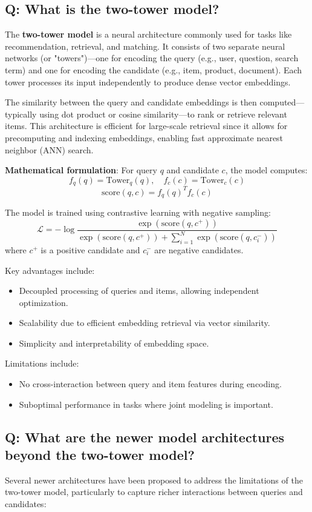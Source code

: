 \subsection*{Q: What is the two-tower model?}
The \textbf{two-tower model} is a neural architecture commonly used for tasks like recommendation, retrieval, and matching. It consists of two separate neural networks (or "towers")—one for encoding the query (e.g., user, question, search term) and one for encoding the candidate (e.g., item, product, document). Each tower processes its input independently to produce dense vector embeddings.

The similarity between the query and candidate embeddings is then computed—typically using dot product or cosine similarity—to rank or retrieve relevant items. This architecture is efficient for large-scale retrieval since it allows for precomputing and indexing embeddings, enabling fast approximate nearest neighbor (ANN) search.

\textbf{Mathematical formulation}:
For query \(q\) and candidate \(c\), the model computes:
\[
f_q(q) = \text{Tower}_q(q), \quad f_c(c) = \text{Tower}_c(c)
\]
\[
\text{score}(q, c) = f_q(q)^T f_c(c)
\]

The model is trained using contrastive learning with negative sampling:
\[
\mathcal{L} = -\log \frac{\exp(\text{score}(q, c^+))}{\exp(\text{score}(q, c^+)) + \sum_{i=1}^{N} \exp(\text{score}(q, c_i^-))}
\]
where \(c^+\) is a positive candidate and \(c_i^-\) are negative candidates.

Key advantages include:
\begin{itemize}
	\item Decoupled processing of queries and items, allowing independent optimization.
	\item Scalability due to efficient embedding retrieval via vector similarity.
	\item Simplicity and interpretability of embedding space.
\end{itemize}

Limitations include:
\begin{itemize}
	\item No cross-interaction between query and item features during encoding.
	\item Suboptimal performance in tasks where joint modeling is important.
\end{itemize}

\subsection*{Q: What are the newer model architectures beyond the two-tower model?}
Several newer architectures have been proposed to address the limitations of the two-tower model, particularly to capture richer interactions between queries and candidates:

